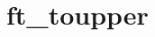 \chapter{ft\+\_\+toupper}
\hypertarget{md_Documentation_2ft__toupper}{}\label{md_Documentation_2ft__toupper}
